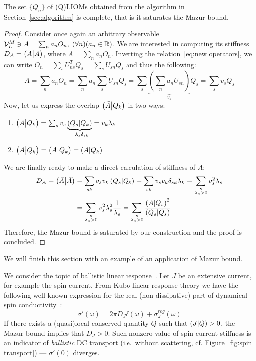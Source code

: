 \begin{proposition}
  The set \(\{Q_n\}\) of (Q)LIOMs obtained from the algorithm in Section~\ref{sec:algorithm} is complete,
  that is it saturates the Mazur bound. 
\label{prop:saturation}
\end{proposition}
\begin{proof}
  Consider once again an arbitrary observable \(\mathcal{V}_L^M \ni A = \sum_n a_n O_n,\; 
  (\forall n) (a_n \in \mathbb{R})\). We are interested in computing its stiffness \(D_A = \left(\bar{A} \middle| \bar{A}\right)\), 
  where \(\bar{A} = \sum_n a_n \bar{O}_n\). Inverting the relation~\eqref{eq:new operators}, we can write 
  \(\bar{O}_n = \sum_s U_{ns}^T Q_s = \sum_s U_{sn} Q_s\) and thus the following:
  \begin{equation*}
    \bar{A} = \sum_n a_n \bar{O}_n = \sum_n a_n \sum_s U_{sn} Q_s =
    \sum_s \underbrace{\left(\sum_n a_n U_{sn}\right)}_{v_s} Q_s = \sum_s v_s Q_s
  \end{equation*}
  Now, let us express the overlap \(\left(\bar{A} \middle| Q_k\right)\) in two ways:
  \begin{enumerate}
    \item \(\left(\bar{A} \middle| Q_k\right) = \sum_s v_s \underbrace{\left(Q_s \middle| Q_k\right)}_{=\lambda_s \delta_{sk}} = v_k \lambda_k\)
    \item \(\left(\bar{A} \middle| Q_k\right) = \left(A \middle| \bar{Q_k}\right) = \left(A \middle| Q_k\right)\)
  \end{enumerate}
  We are finally ready to make a direct calculation of stiffness of \(A\):
  \begin{align*}
    D_A = \left(\bar{A} \middle| \bar{A}\right) &= \sum_{sk} v_s v_k \left(Q_s \middle| Q_k\right) = \sum_{sk} v_s v_k \delta_{sk} \lambda_{k} = 
    \sum_{\substack{s\\\lambda_s > 0}} v_s^2 \lambda_s \\
    &= \sum_{\substack{s\\\lambda_s > 0}} v_s^2 \lambda_s^2 \frac{1}{\lambda_s} = 
    \sum_{\substack{s\\\lambda_s > 0}} \frac{\left(A \middle| Q_s\right)^2}{\left(Q_s \middle| Q_s\right)}
  \end{align*}
  Therefore, the Mazur bound is saturated by our construction and the proof is concluded.
\end{proof}
We will finish this section with an example of an application of Mazur bound. 
\begin{example}
  We consider the topic of ballistic linear response~\autocite{Ilievski2016a}. Let \(J\) be an extensive current,
  for example the spin current. From Kubo linear response theory
  we have the following well-known expression for the real (non-dissipative) part of dynamical
  spin conductivity~\autocite{Zotos1996}:
  \begin{equation}
    \sigma'(\omega) = 2 \pi D_J \delta(\omega) + \sigma_J^{reg}(\omega)
  \label{eq:conductivity}
  \end{equation}
If there exists a (quasi)local conserved quantity \(Q\) such that \(\left(J \middle| Q\right)>0\), the Mazur bound
implies that \(D_J > 0\). Such nonzero value of spin current stiffness is an indicator of \textit{ballistic}
DC transport (i.e.\ without scattering, cf. Figure~\ref{fig:spin transport}) --- \(\sigma'(0)\) diverges. 
\end{example}
